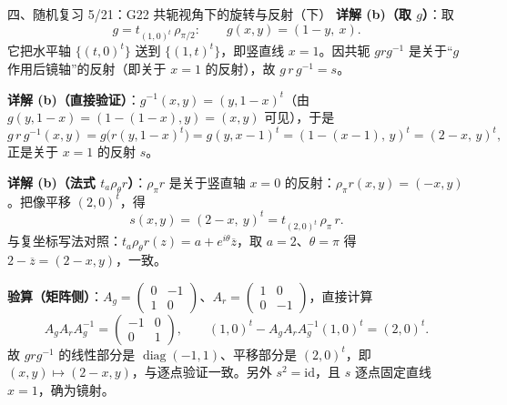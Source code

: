\documentclass[aspectratio=169,10pt,fontset=none]{ctexbeamer}
\newcommand{\key}[1]{\textcolor{ink}{\bfseries #1}}
\begin{document}
\begin{frame}[t]{四、随机复习 5/21：G22 共轭视角下的旋转与反射（下）}
\scriptsize
\key{详解 (b)（取 $g$）}：取
\[ g=t_{(1,0)^t}\,\rho_{\pi/2}:\qquad g(x,y)=(1-y,\ x). \]
它把水平轴 $\{(t,0)^t\}$ 送到 $\{(1,t)^t\}$，即竖直线 $x=1$。因共轭 $grg^{-1}$ 是关于“$g$ 作用后镜轴”的反射（即关于 $x=1$ 的反射），故 $g\,r\,g^{-1}=s$。

\key{详解 (b)（直接验证）}：$g^{-1}(x,y)=(y,1-x)^t$（由 $g(y,1-x)=(1-(1-x),y)=(x,y)$ 可见），于是
\[ g\,r\,g^{-1}(x,y)=g\bigl(r(y,1-x)^t\bigr)=g(y,x-1)^t=(1-(x-1),\,y)^t=(2-x,\,y)^t, \]
正是关于 $x=1$ 的反射 $s$。

\key{详解 (b)（法式 $t_a\rho_\theta r$）}：$\rho_\pi r$ 是关于竖直轴 $x=0$ 的反射：$\rho_\pi r(x,y)=(-x,y)$。把像平移 $(2,0)^t$，得
\[ s(x,y)=(2-x,\ y)^t=t_{(2,0)^t}\,\rho_\pi\,r. \]
与复坐标写法对照：$t_a\rho_\theta r(z)=a+e^{i\theta}\overline z$，取 $a=2$、$\theta=\pi$ 得 $2-\overline z=(2-x,y)$，一致。

\key{验算（矩阵侧）}：$A_g=\begin{pmatrix}0&-1\\1&0\end{pmatrix}$、$A_r=\begin{pmatrix}1&0\\0&-1\end{pmatrix}$，直接计算
\[ A_gA_rA_g^{-1}=\begin{pmatrix}-1&0\\0&1\end{pmatrix},\qquad (1,0)^t-A_gA_rA_g^{-1}(1,0)^t=(2,0)^t. \]
故 $grg^{-1}$ 的线性部分是 $\operatorname{diag}(-1,1)$、平移部分是 $(2,0)^t$，即 $(x,y)\mapsto(2-x,y)$，与逐点验证一致。另外 $s^2=\mathrm{id}$，且 $s$ 逐点固定直线 $x=1$，确为镜射。
\end{frame}
\end{document}
